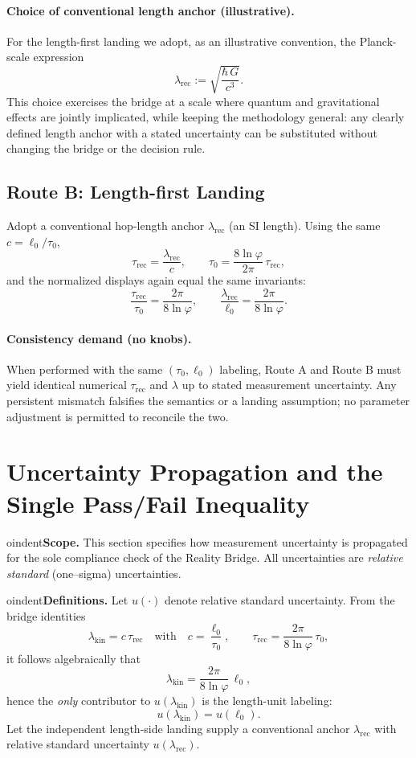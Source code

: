 \documentclass[11pt]{article}
\theoremstyle{plain}
\theoremstyle{definition}
\theoremstyle{remark}
\begin{document}
\paragraph{Choice of conventional length anchor (illustrative).}
For the length-first landing we adopt, as an illustrative convention, the Planck-scale expression
\[
\lambda_{\mathrm{rec}}:=\sqrt{\frac{\hbar\,G}{c^{3}}}.
\]
This choice exercises the bridge at a scale where quantum and gravitational effects are jointly implicated, while keeping the methodology general: any clearly defined length anchor with a stated uncertainty can be substituted without changing the bridge or the decision rule.

\subsection*{Route B: Length-first Landing}
Adopt a conventional hop-length anchor \(\lambda_{\mathrm{rec}}\) (an SI length). Using the same \(c=\ell_{0}/\tau_{0}\),
\[
\tau_{\mathrm{rec}}=\frac{\lambda_{\mathrm{rec}}}{c},
\qquad
\tau_{0}=\frac{8\ln\varphi}{2\pi}\,\tau_{\mathrm{rec}},
\]
and the normalized displays again equal the same invariants:
\[
\frac{\tau_{\mathrm{rec}}}{\tau_{0}}=\frac{2\pi}{8\ln\varphi},
\qquad
\frac{\lambda_{\mathrm{rec}}}{\ell_{0}}=\frac{2\pi}{8\ln\varphi}.
\]

\paragraph{Consistency demand (no knobs).}
When performed with the same \((\tau_{0},\ell_{0})\) labeling, Route A and Route B must yield identical numerical \(\tau_{\mathrm{rec}}\) and \(\lambda\) up to stated measurement uncertainty. Any persistent mismatch falsifies the semantics or a landing assumption; no parameter adjustment is permitted to reconcile the two.

\section{Uncertainty Propagation and the Single Pass/Fail Inequality}


oindent\textbf{Scope.} This section specifies how measurement uncertainty is propagated for the sole compliance check of the Reality Bridge. All uncertainties are \emph{relative standard} (one–sigma) uncertainties.

\medskip

oindent\textbf{Definitions.} Let \(u(\cdot)\) denote relative standard uncertainty. From the bridge identities
\[
\lambda_{\mathrm{kin}}=c\,\tau_{\mathrm{rec}}
\quad\text{with}\quad
c=\frac{\ell_{0}}{\tau_{0}},
\qquad
\tau_{\mathrm{rec}}=\frac{2\pi}{8\ln\varphi}\,\tau_{0},
\]
it follows algebraically that
\[
\lambda_{\mathrm{kin}}
=\frac{2\pi}{8\ln\varphi}\,\ell_{0},
\]
hence the \emph{only} contributor to \(u(\lambda_{\mathrm{kin}})\) is the length-unit labeling:
\[
u(\lambda_{\mathrm{kin}})=u(\ell_{0}).
\]
Let the independent length-side landing supply a conventional anchor \(\lambda_{\mathrm{rec}}\) with relative standard uncertainty \(u(\lambda_{\mathrm{rec}})\).
\end{document}
